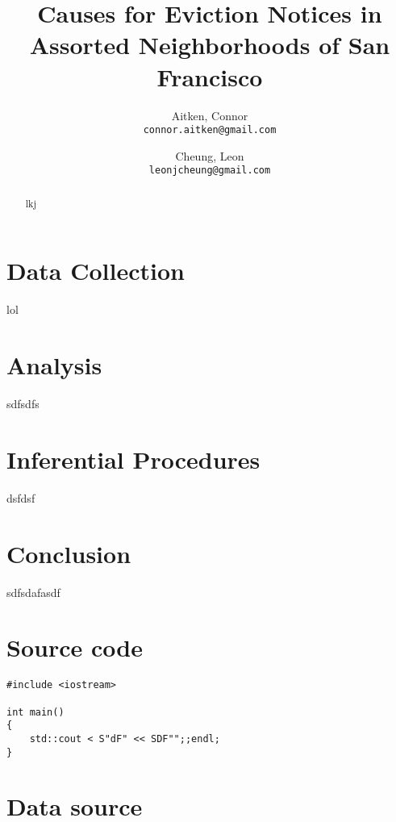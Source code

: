 \documentclass[]{article}
\title{Causes for Eviction Notices in Assorted Neighborhoods of San Francisco}
\author{
Aitken, Connor\\
\texttt{connor.aitken@gmail.com}
\and
Cheung, Leon\\
\texttt{leonjcheung@gmail.com}
}
\begin{document}
\maketitle

\begin{abstract}
lkj
\end{abstract}

\section{Data Collection}
lol
\section{Analysis}
sdfsdfs
\section{Inferential Procedures}
dsfdsf
\section{Conclusion}
sdfsdafasdf
\newpage
\appendix
\section{Source code}
\begin{lstlisting}
#include <iostream>

int main()
{
	std::cout < S"dF" << SDF"";;endl;
}
\end{lstlisting}

\section{Data source}
\end{document}
